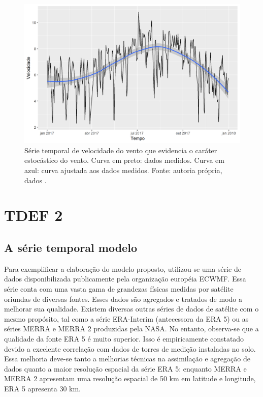 \documentclass[
	12pt,				%
	openright,			%
	oneside,			%
	a4paper,			%
	english,			%
	french,				%
	spanish,			%
	brazil				%
	]{abntex2}
\begin{document}
\begin{figure}[h]
    \centering
	\includegraphics[width=\textwidth]{stochastic}
	\caption{Série temporal de velocidade do vento que evidencia o caráter estocástico do vento. Curva em preto: dados medidos. Curva em azul: curva ajustada aos dados medidos. Fonte: autoria própria, dados \cite{era5}.}
\end{figure}
\FloatBarrier

\cleardoublepage
\part{TDEF 2}

\chapter{A série temporal modelo}

Para exemplificar a elaboração do modelo proposto, utilizou-se uma série de dados disponibilizada publicamente pela organização européia ECWMF. Essa série conta com uma vasta gama de grandezas físicas medidas por satélite oriundas de diversas fontes. Esses dados são agregados e tratados de modo a melhorar sua qualidade. Existem diversas outras séries de dados de satélite com o mesmo propósito, tal como a série ERA-Interim (antecessora da ERA 5) ou as séries MERRA e MERRA 2 produzidas pela NASA. No entanto, observa-se que a qualidade da fonte ERA 5 é muito superior. Isso é empiricamente constatado devido a excelente correlação com dados de torres de medição instaladas no solo. Essa melhoria deve-se tanto a melhorias técnicas na assimilação e agregação de dados quanto a maior resolução espacial da série ERA 5: enquanto MERRA e MERRA 2 apresentam uma resolução espacial de 50 km em latitude e longitude, ERA 5 apresenta 30 km. 
\end{document}
